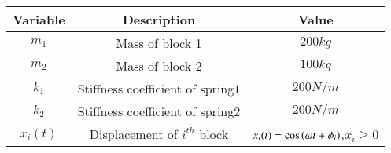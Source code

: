     \begin{tabular}{|c|c|c|} 
    \hline
\textbf{Variable} & \textbf{Description} & \textbf{Value} \\\hline
    $m_1$ & Mass of block 1 & $200kg$  \\\hline
    $m_2$ & Mass of block 2 & $100kg$  \\\hline
    $k_1$ & Stiffness coefficient of spring$1$ & $200N/m$  \\\hline
    $k_2$ & Stiffness coefficient of spring$2$ & $200N/m$  \\\hline
    $x_i(t)$ & Displacement of $i^{th}$ block & $x_i(t)=\cos \left(\omega t +\phi _i\right)$,$x_i\geq 0$ \\ \hline
        \end{tabular}
    
    
